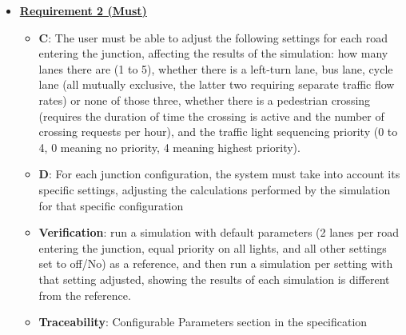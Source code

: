 \documentclass{article}
\begin{document}
\begin{itemize}
    \item \textbf{\underline{Requirement 2 (Must)}}
    \begin{itemize}
        \item \textbf{C}: The user must be able to adjust the following settings for each 
            road entering the junction, affecting the results of the simulation: how many 
            lanes there are (1 to 5), whether there is a left-turn lane, bus lane, cycle 
            lane (all mutually exclusive, the latter two requiring separate traffic flow rates) 
            or none of those three, whether there is a pedestrian crossing (requires the duration 
            of time the crossing is active and the number of crossing requests per hour), 
            and the traffic light sequencing priority (0 to 4, 0 meaning no priority, 4 
            meaning highest priority).
        \item \textbf{D}: For each junction configuration, the system must take into account 
            its specific settings, adjusting the calculations performed by the simulation 
            for that specific configuration
        \item \textbf{Verification}: run a simulation with default parameters (2 lanes per 
            road entering the junction, equal priority on all lights, and all other 
            settings set to off/No) as a reference, and then run a simulation per setting 
            with that setting adjusted, showing the results of each simulation is different 
            from the reference.
        \item\textbf{Traceability}: Configurable Parameters section in the specification
    \end{itemize}


\end{itemize}
\end{document}
